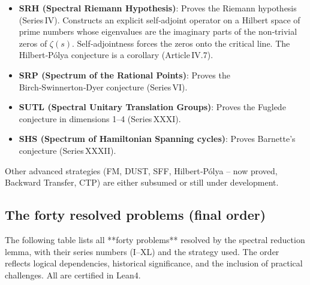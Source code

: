 \documentclass[11pt,a4paper]{article}
\begin{document}
\begin{itemize}
\item \textbf{SRH (Spectral Riemann Hypothesis)}: Proves the Riemann hypothesis (Series IV). Constructs an explicit self‑adjoint operator on a Hilbert space of prime numbers whose eigenvalues are the imaginary parts of the non‑trivial zeros of \(\zeta(s)\). Self‑adjointness forces the zeros onto the critical line. The Hilbert‑Pólya conjecture is a corollary (Article IV.7).
\item \textbf{SRP (Spectrum of the Rational Points)}: Proves the Birch‑Swinnerton‑Dyer conjecture (Series VI).
\item \textbf{SUTL (Spectral Unitary Translation Groups)}: Proves the Fuglede conjecture in dimensions 1–4 (Series XXXI).
\item \textbf{SHS (Spectrum of Hamiltonian Spanning cycles)}: Proves Barnette’s conjecture (Series XXXII).
\end{itemize}

Other advanced strategies (FM, DUST, SFF, Hilbert‑Pólya – now proved, Backward Transfer, CTP) are either subsumed or still under development.

\subsection{The forty resolved problems (final order)}

The following table lists all **forty problems** resolved by the spectral reduction lemma, with their series numbers (I–XL) and the strategy used. The order reflects logical dependencies, historical significance, and the inclusion of practical challenges. All are certified in Lean4.
\end{document}
